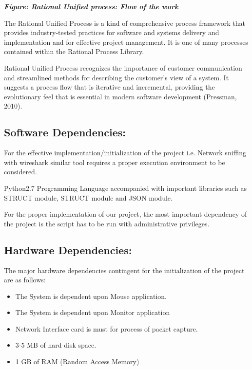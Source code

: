 \documentclass[a4paper,12pt]{report}
\begin{document}
\emph{\large \textbf{Figure: Rational Unified process: Flow of the work\\}}

The Rational Unified Process is a kind of comprehensive process
framework that provides industry-tested practices for software and
systems delivery and implementation and for effective project
management. It is one of many processes contained within the Rational
Process Library.

Rational Unified Process recognizes the importance of customer
communication and streamlined methods for describing the customer's view
of a system. It suggests a process flow that is iterative and
incremental, providing the evolutionary feel that is essential in modern
software development (Pressman, 2010).


\subsection{ Software Dependencies:}

For the effective implementation/initialization of the project i.e.
Network sniffing with wireshark similar tool requires a proper execution
environment to be considered.

Python2.7 Programming Language accompanied with important libraries such
as STRUCT module, STRUCT module and JSON module.

For the proper implementation of our project, the most important
dependency of the project is the script has to be run with
administrative privileges.


\subsection{Hardware Dependencies:}


The major hardware dependencies contingent for the initialization of the
project are as follows:

\begin{itemize}
\item
  The System is dependent upon Mouse application.
\item
  The System is dependent upon Monitor application
\item
  Network Interface card is must for process of packet capture.
\item
  3-5 MB of hard disk space.
\item
  1 GB of RAM (Random Access Memory)
\end{itemize}
\newpage
\bigbreak
\end{document}
